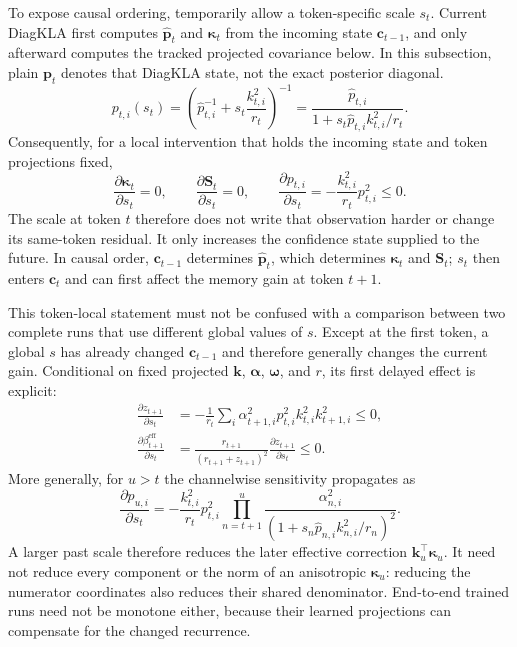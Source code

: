 \documentclass[11pt]{article}
\newcommand{\vct}[1]{\boldsymbol{#1}}
\begin{document}
To expose causal ordering, temporarily allow a token-specific scale $s_t$. Current DiagKLA first
computes $\widehat{\vct{p}}_t$ and $\vct{\kappa}_t$ from the incoming state
$\vct{c}_{t-1}$, and only afterward computes the tracked projected covariance below. In this
subsection, plain $\vct{p}_t$ denotes that DiagKLA state, not the exact posterior diagonal.
\begin{equation}
  p_{t,i}(s_t)
  =\left(\widehat p_{t,i}^{-1}
    +s_t\frac{k_{t,i}^2}{r_t}\right)^{-1}
  =\frac{\widehat p_{t,i}}
    {1+s_t\widehat p_{t,i}k_{t,i}^2/r_t}.
  \label{eq:discussion-current-scale-update}
\end{equation}
Consequently, for a local intervention that holds the incoming state and token projections fixed,
\begin{equation}
  \frac{\partial\vct{\kappa}_t}{\partial s_t}=0,
  \qquad
  \frac{\partial\vct{S}_t}{\partial s_t}=0,
  \qquad
  \frac{\partial p_{t,i}}{\partial s_t}
  =-\frac{k_{t,i}^2}{r_t}p_{t,i}^2\leq0.
  \label{eq:discussion-current-scale-derivatives}
\end{equation}
The scale at token $t$ therefore does not write that observation harder or change its same-token
residual. It only increases the confidence state supplied to the future. In causal order,
$\vct{c}_{t-1}$ determines $\widehat{\vct{p}}_t$, which determines
$\vct{\kappa}_t$ and $\vct{S}_t$; $s_t$ then enters $\vct{c}_t$ and can first affect the
memory gain at token $t+1$.

This token-local statement must not be confused with a comparison between two complete runs that
use different global values of $s$. Except at the first token, a global $s$ has already changed
$\vct{c}_{t-1}$ and therefore generally changes the current gain. Conditional on fixed projected
$\vct{k}$, $\vct{\alpha}$, $\vct{\omega}$, and $r$, its first delayed effect is explicit:
\begin{align}
  \frac{\partial z_{t+1}}{\partial s_t}
  &=-\frac{1}{r_t}\sum_i
    \alpha_{t+1,i}^2p_{t,i}^2k_{t,i}^2k_{t+1,i}^2\leq0, \\
  \frac{\partial\beta_{t+1}^{\mathrm{eff}}}{\partial s_t}
  &=\frac{r_{t+1}}{(r_{t+1}+z_{t+1})^2}
    \frac{\partial z_{t+1}}{\partial s_t}\leq0.
  \label{eq:discussion-delayed-scale-effect}
\end{align}
More generally, for $u>t$ the channelwise sensitivity propagates as
\begin{equation}
  \frac{\partial p_{u,i}}{\partial s_t}
  =-\frac{k_{t,i}^2}{r_t}p_{t,i}^2
    \prod_{n=t+1}^{u}
    \frac{\alpha_{n,i}^2}
      {(1+s_n\widehat p_{n,i}k_{n,i}^2/r_n)^2}.
  \label{eq:discussion-scale-sensitivity-propagation}
\end{equation}
A larger past scale therefore reduces the later effective correction
$\vct{k}_u^\top\vct{\kappa}_u$. It need not reduce every component or the norm of an
anisotropic $\vct{\kappa}_u$: reducing the numerator coordinates also reduces their shared
denominator. End-to-end trained runs need not be monotone either, because their learned
projections can compensate for the changed recurrence.
\end{document}
